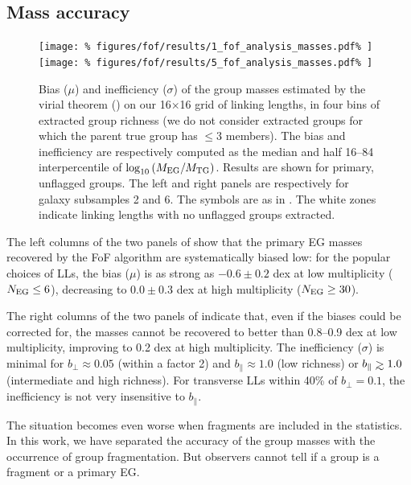 \subsection{Mass accuracy}
%
\begin{figure}[t]
    \centering
    \texttt{[image: \%
        figures/fof/results/1\_fof\_analysis\_masses.pdf\%
    ]}
    \texttt{[image: \%
        figures/fof/results/5\_fof\_analysis\_masses.pdf\%
    ]}
    \caption{Bias ($\mu$) and inefficiency ($\sigma$) of the group masses
        estimated  by the virial theorem () on our
        16$\times$16  grid of linking lengths, in four bins of extracted group
        richness (we do not consider extracted groups for which the parent true
        group has $\leq3$ members). The bias and inefficiency are respectively
        computed as the median and half 16--84 interpercentile of
        $\log_{10}\left(M_{\rm EG}/M_{\rm TG}\right)$. Results are shown for
        primary, unflagged groups. The left and right panels are respectively
        for galaxy subsamples 2 and 6. The symbols are as in
        . The white zones indicate linking
        lengths with no unflagged groups extracted.\label{fig:masses_diff}}
\end{figure}

The left columns  of the two panels of  show that
the primary EG masses recovered by the FoF algorithm are systematically biased
low: for the popular choices of LLs, the bias ($\mu$) is as strong as
$-0.6\pm0.2$ dex at low multiplicity ($N_{\rm EG}\leq 6$), decreasing to
$0.0\pm0.3$ dex at high multiplicity ($N_{\rm EG}\geq 30$).

The right columns of the two panels of  indicate
that, even if the biases could be corrected for, the masses cannot be recovered
to better than 0.8--0.9 dex at low multiplicity, improving to 0.2 dex at high
multiplicity. The  inefficiency ($\sigma$) is minimal for $b_\perp \approx
0.05$ (within a factor 2) and $b_\parallel \approx 1.0$ (low richness) or
$b_\parallel \ga 1.0$ (intermediate and high richness). For transverse LLs
within 40\% of $b_\perp=0.1$, the inefficiency is not very insensitive to
$b_\parallel$.

The situation becomes even worse when fragments are included in the statistics.
In this work, we have separated the accuracy of the group masses with the
occurrence of group fragmentation. But observers cannot tell if a group is a
fragment or a primary EG\@.

